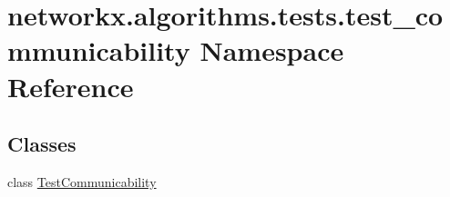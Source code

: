 \hypertarget{namespacenetworkx_1_1algorithms_1_1tests_1_1test__communicability}{}\section{networkx.\+algorithms.\+tests.\+test\+\_\+communicability Namespace Reference}
\label{namespacenetworkx_1_1algorithms_1_1tests_1_1test__communicability}
\subsection*{Classes}
\begin{DoxyCompactItemize}
\item 
class \hyperlink{classnetworkx_1_1algorithms_1_1tests_1_1test__communicability_1_1TestCommunicability}{Test\+Communicability}
\end{DoxyCompactItemize}
